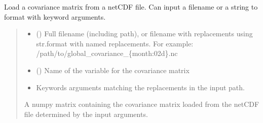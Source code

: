 \documentclass[letterpaper,10pt,english]{sphinxmanual}
\begin{document}
\begin{fulllineitems}
\label{\detokenize{covariance:glomar_gridding.interpolation_covariance.load_covariance}}
\pysigstartsignatures
\pysiglinewithargsret
{}
{\sphinxparamcomma {}\sphinxparamcomma {}}
{}
\pysigstopsignatures
\sphinxAtStartPar
Load a covariance matrix from a netCDF file. Can input a filename or a
string to format with keyword arguments.
\begin{quote}\begin{description}
\begin{itemize}
\item {}
\sphinxAtStartPar
{} () \textendash{} Full filename (including path), or filename with replacements using
str.format with named replacements. For example:
/path/to/global\_covariance\_\{month:02d\}.nc

\item {}
\sphinxAtStartPar
{} () \textendash{} Name of the variable for the covariance matrix

\item {}
\sphinxAtStartPar
{} \textendash{} Keywords arguments matching the replacements in the input path.

\end{itemize}

\sphinxAtStartPar
{} \textendash{} A numpy matrix containing the covariance matrix loaded from the netCDF
file determined by the input arguments.

\sphinxAtStartPar
{}

\end{description}\end{quote}

\end{fulllineitems}
\end{document}
